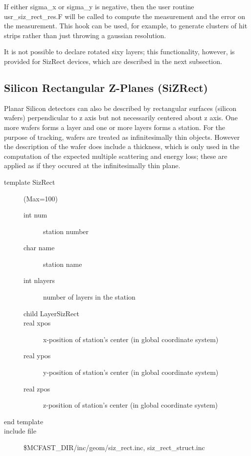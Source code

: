 If either sigma\_x or sigma\_y is negative, then the user
routine usr\_siz\_rect\_res.F will be called to compute the
measurement and the error on the measurement.  This hook can be
used, for example, to generate clusters of hit strips rather
than just throwing a gaussian resolution.

It is not possible to declare rotated sixy layers;
this functionality, however, is provided for SizRect devices,
which are described in the next subsection.
\filbreak

\subsection{Silicon Rectangular Z-Planes (SiZRect)} 
Planar Silicon detectors 
can also be described by rectangular surfaces (silicon wafers) perpendicular 
to z axis but not necessarily centered about z axis.
One more wafers forms a layer and one or more layers forms a station. 
For the purpose of tracking, wafers are treated as infinitesimally
thin objects. However the description of the wafer does include a thickness,
which is only used in the computation of the expected multiple scattering
and energy loss; these are applied as if they occured at the infinitesimally
thin plane. 

\begin{description}
\item[{\rm template} SizRect] (Max=100) 
\begin{description}
\item[{\rm int} num]  station number 
\item[{\rm char} name] station name 
\item[{\rm int} nlayers] number of layers in the station 
\item[{\rm child} LayerSizRect ] 
\item[{\rm real} xpos] x-position of station's center (in global 
coordinate system) 
\item[{\rm real} ypos] y-position of station's center (in global 
coordinate system) 
\item[{\rm real} zpos] z-position of station's center (in global 
coordinate system) 
\end{description}
\item[end template] 
\item[include file] \$MCFAST\_DIR/inc/geom/siz\_rect.inc,
siz\_rect\_struct.inc 
\end{description}

